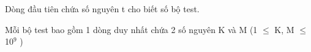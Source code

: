 Dòng đầu tiên chứa số nguyên t cho biết số bộ test.

Mỗi bộ test bao gồm 1 dòng duy nhất chứa 2 số nguyên K và M (1  $\le$  K, M  $\le$  10$^9 $ )

\